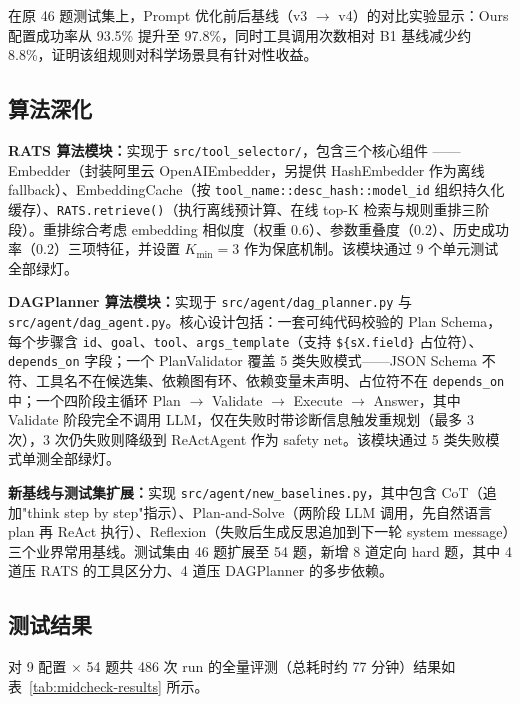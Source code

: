 在原 46 题测试集上，Prompt 优化前后基线（v3 $\to$ v4）的对比实验显示：Ours 配置成功率从 93.5\% 提升至 97.8\%，同时工具调用次数相对 B1 基线减少约 8.8\%，证明该组规则对科学场景具有针对性收益。

\subsection{算法深化}

\textbf{RATS 算法模块：}实现于 \texttt{src/tool\_selector/}，包含三个核心组件 —— Embedder（封装阿里云 OpenAIEmbedder，另提供 HashEmbedder 作为离线 fallback）、EmbeddingCache（按 \texttt{tool\_name::desc\_hash::model\_id} 组织持久化缓存）、\texttt{RATS.retrieve()}（执行离线预计算、在线 top-K 检索与规则重排三阶段）。重排综合考虑 embedding 相似度（权重 0.6）、参数重叠度（0.2）、历史成功率（0.2）三项特征，并设置 $K_{\min}=3$ 作为保底机制。该模块通过 9 个单元测试全部绿灯。

\textbf{DAGPlanner 算法模块：}实现于 \texttt{src/agent/dag\_planner.py} 与 \texttt{src/agent/dag\_agent.py}。核心设计包括：一套可纯代码校验的 Plan Schema，每个步骤含 \texttt{id}、\texttt{goal}、\texttt{tool}、\texttt{args\_template}（支持 \texttt{\$\{sX.field\}} 占位符）、\texttt{depends\_on} 字段；一个 PlanValidator 覆盖 5 类失败模式——JSON Schema 不符、工具名不在候选集、依赖图有环、依赖变量未声明、占位符不在 \texttt{depends\_on} 中；一个四阶段主循环 Plan $\to$ Validate $\to$ Execute $\to$ Answer，其中 Validate 阶段完全不调用 LLM，仅在失败时带诊断信息触发重规划（最多 3 次），3 次仍失败则降级到 ReActAgent 作为 safety net。该模块通过 5 类失败模式单测全部绿灯。

\textbf{新基线与测试集扩展：}实现 \texttt{src/agent/new\_baselines.py}，其中包含 CoT（追加"think step by step"指示）、Plan-and-Solve（两阶段 LLM 调用，先自然语言 plan 再 ReAct 执行）、Reflexion（失败后生成反思追加到下一轮 system message）三个业界常用基线。测试集由 46 题扩展至 54 题，新增 8 道定向 hard 题，其中 4 道压 RATS 的工具区分力、4 道压 DAGPlanner 的多步依赖。

\subsection{测试结果}

对 9 配置 $\times$ 54 题共 486 次 run 的全量评测（总耗时约 77 分钟）结果如表~\ref{tab:midcheck-results} 所示。

